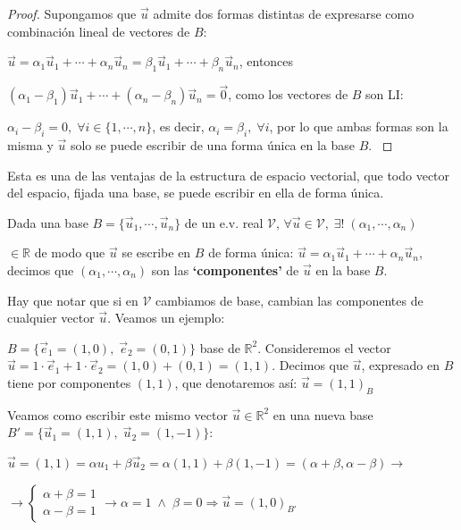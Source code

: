 \begin{proof}

\noindent \textcolor{gris}{Supongamos que $\vec u$ admite dos formas distintas de expresarse como combinación lineal de vectores de $B$:  }	

\noindent \textcolor{gris}{$\vec u=\alpha_1 \vec u_1+ \cdots + \alpha_n \vec u_n=\beta_1 \vec u_1+ \cdots + \beta_n \vec u_n $, entonces   }	

\noindent \textcolor{gris}{$(\alpha_1-\beta_1) \vec u_1+\cdots + (\alpha_n-\beta_n) \vec u_n= \vec 0$, como los vectores de $B$ son LI:   }	

\noindent \textcolor{gris}{$\alpha_i - \beta_i=0,\; \forall i\in \{1, \cdots, n\}$, es decir, $\alpha_i=\beta_i, \; \forall i$, por lo que ambas formas son la misma y $\vec u$ solo se puede escribir de una forma única en la base $B$.   }	

\end{proof}

Esta es una de las ventajas de la estructura de espacio vectorial, que todo vector del espacio, fijada una base, se puede escribir en ella de forma única.

Dada una base $B=\{\vec u_1, \cdots, \vec u_n \}$ de un e.v. real $\mathcal V$, $\forall \vec u \in \mathcal V, \; \exists !\; (\alpha_1, \cdots , \alpha_n )$

\vspace{-2mm} \noindent $\in \mathbb R$ de modo que $\vec u$ se escribe en $B$ de forma única:
$\vec u=\alpha_1 \vec u_1+ \cdots + \alpha_n \vec u_n$, decimos que $(\alpha_1, \cdots, \alpha_n)$ son las \textbf{`componentes'} de $\vec u$ en la base $B$.

Hay que notar que si en $\mathcal V$ cambiamos de base, cambian las componentes de cualquier vector $\vec u$. Veamos un ejemplo:

$B=\{ \vec e_1=(1,0),\; \vec e_2=(0,1)\}$ base de $\mathbb R^2$. Consideremos el vector $\vec u=1\cdot \vec e_1+ 1 \cdot \vec e_2=(1,0)+(0,1)=(1,1)$. Decimos que $\vec u$, expresado en $B$ tiene por componentes $(1,1)$, que denotaremos así: $\vec u=(1,1)_B$

Veamos como escribir este mismo vector $\vec u \in \mathbb R^2$ en una nueva base $B'=\{ \vec u_1=(1,1),\; \vec u_2=(1,-1)\}$: 

\noindent $\vec u=(1,1)=\alpha u_1+\beta \vec u_2=\alpha (1,1)+\beta (1,-1)=(\alpha+\beta, \alpha-\beta)\to $

\noindent $\to \begin{cases} \alpha+\beta=1 \\ \alpha-\beta=1 \end{cases} \to \alpha=1\; \wedge \; \beta =0 \Rightarrow \vec u=(1,0)_{B'} $

